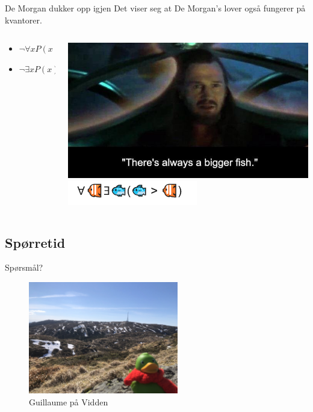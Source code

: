 \begin{frame}{De Morgan dukker opp igjen}
Det viser seg at De Morgan's lover også fungerer på kvantorer.\\
    \begin{columns}
    \begin{column}{0.48\textwidth}
    \begin{itemize}
        \item $\lnot \forall x P(x) \equiv \exists x \lnot P(x)$
        \item $\lnot \exists x P(x) \equiv \forall x \lnot P(x)$
    \end{itemize}        
    \end{column}
    \pause
    \begin{column}{0.48\textwidth}
        \includegraphics[scale=0.3]{Always a bigger fish.jpeg}
        \pause
        \includegraphics[scale=1]{bigger fish.PNG}
    \end{column}
    \end{columns}
    

\end{frame}

\subsection*{Spørretid}
\begin{frame}{Spørsmål?}
    \begin{figure}
        \centering
        \includegraphics[height = 4.9cm]{images/guillaume5.jpg}
        \caption{Guillaume på Vidden}
        \label{fig:guillaume5}
    \end{figure}
\end{frame}


